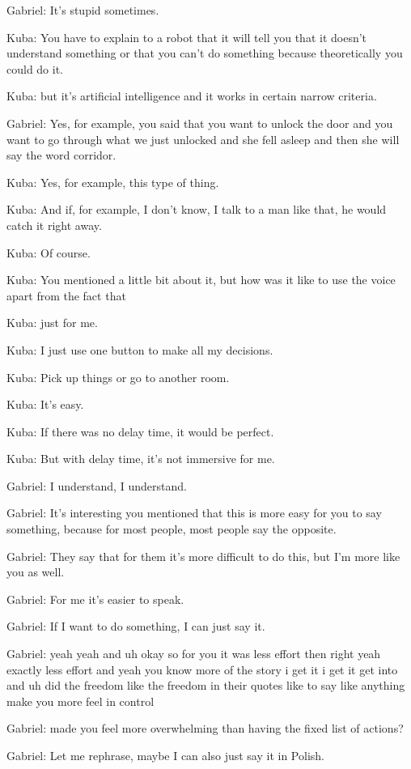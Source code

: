 Gabriel: It's stupid sometimes.

Kuba: You have to explain to a robot that it will tell you that it doesn't understand something or that you can't do something because theoretically you could do it.

Kuba: but it's artificial intelligence and it works in certain narrow criteria.

Gabriel: Yes, for example, you said that you want to unlock the door and you want to go through what we just unlocked and she fell asleep and then she will say the word corridor.

Kuba: Yes, for example, this type of thing.

Kuba: And if, for example, I don't know, I talk to a man like that, he would catch it right away.

Kuba: Of course.

Kuba: You mentioned a little bit about it, but how was it like to use the voice apart from the fact that

Kuba: just for me.

Kuba: I just use one button to make all my decisions.

Kuba: Pick up things or go to another room.

Kuba: It's easy.

Kuba: If there was no delay time, it would be perfect.

Kuba: But with delay time, it's not immersive for me.

Gabriel: I understand, I understand.

Gabriel: It's interesting you mentioned that this is more easy for you to say something, because for most people, most people say the opposite.

Gabriel: They say that for them it's more difficult to do this, but I'm more like you as well.

Gabriel: For me it's easier to speak.

Gabriel: If I want to do something, I can just say it.

Gabriel: yeah yeah and uh okay so for you it was less effort then right yeah exactly less effort and yeah you know more of the story i get it i get it get into and uh did the freedom like the freedom in their quotes like to say like anything make you more feel in control

Gabriel: made you feel more overwhelming than having the fixed list of actions?

Gabriel: Let me rephrase, maybe I can also just say it in Polish.

